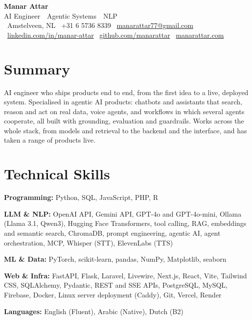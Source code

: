 \documentclass[10pt]{article}
\begin{document}
\begin{center}
  {\Huge\bfseries\color{navy} Manar Attar}\\[3pt]
  {\large\color{gray} AI Engineer \,\textbar\, Agentic Systems \,\textbar\, NLP}\\[5pt]
  {\small
    \faMapMarker*\, Amstelveen, NL \quad
    \faPhone*\, +31 6 5736 8339 \quad
    \faEnvelope\, \href{mailto:manarattar77@gmail.com}{manarattar77@gmail.com}\\[2pt]
    \faLinkedin\, \href{https://linkedin.com/in/manar-attar}{linkedin.com/in/manar-attar} \quad
    \faGithub\, \href{https://github.com/manarattar}{github.com/manarattar} \quad
    \faGlobe\, \href{https://manarattar.com}{manarattar.com}}
\end{center}
\vspace{-2pt}

\section*{Summary}
\vspace{-2pt}
{\small AI engineer who ships products end to end, from the first idea to a live, deployed system. Specialised in agentic AI products: chatbots and assistants that search, reason and act on real data, voice agents, and workflows in which several agents cooperate, all built with grounding, evaluation and guardrails. Works across the whole stack, from models and retrieval to the backend and the interface, and has taken a range of products live.}

\section*{Technical Skills}
\vspace{1pt}
{\small
\textbf{Programming:} Python, SQL, JavaScript, PHP, R\par\vspace{1.5pt}
\textbf{LLM \& NLP:} OpenAI API, Gemini API, GPT-4o and GPT-4o-mini, Ollama (Llama 3.1, Qwen3), Hugging Face Transformers, tool calling, RAG, embeddings and semantic search, ChromaDB, prompt engineering, agentic AI, agent orchestration, MCP, Whisper (STT), ElevenLabs (TTS)\par\vspace{1.5pt}
\textbf{ML \& Data:} PyTorch, scikit-learn, pandas, NumPy, Matplotlib, seaborn\par\vspace{1.5pt}
\textbf{Web \& Infra:} FastAPI, Flask, Laravel, Livewire, Next.js, React, Vite, Tailwind CSS, SQLAlchemy, Pydantic, REST and SSE APIs, PostgreSQL, MySQL, Firebase, Docker, Linux server deployment (Caddy), Git, Vercel, Render\par\vspace{1.5pt}
\textbf{Languages:} English (Fluent), Arabic (Native), Dutch (B2)}
\end{document}

